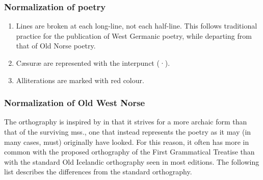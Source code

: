     \subsubsection{Normalization of poetry}
    \begin{enumerate}
      \item Lines are broken at each long-line, not each half-line. This follows traditional practice for the publication of West Germanic poetry, while departing from that of Old Norse poetry.
      \item Cæsuræ are represented with the interpunct (·).
      \item Alliterations are marked with red colour.
    \end{enumerate}

    \subsubsection{Normalization of Old West Norse}
    The orthography is inspired by \textcite{FinnurEdda} in that it strives for a more archaic form than that of the surviving mss., one that instead represents the poetry as it may (in many cases, must) originally have looked. For this reason, it often has more in common with the proposed orthography of the First Grammatical Treatise than with the standard Old Icelandic orthography seen in most editions. The following list describes the differences from the standard orthography.

